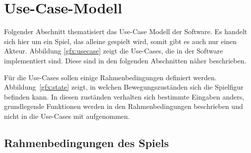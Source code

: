 \documentclass{article}
\begin{document}
\section{Use-Case-Modell} \label{subsec:usecase}

Folgender Abschnitt thematisiert das Use-Case Modell der Software. Es handelt sich hier um ein Spiel, das alleine gespielt wird, somit gibt es auch nur einen Akteur. Abbildung \ref{gfx:usecase} zeigt die Use-Cases, die in der Software implementiert sind. Diese sind in den folgenden Abschnitten näher beschrieben.

Für die Use-Cases sollen einige Rahmenbedingungen definiert werden. Abbildung~\ref{gfx:state} zeigt, in welchen Bewegungszuständen sich die Spielfigur befinden kann. In diesen zuständen verhalten sich bestimmte Eingaben anders, grundlegende Funktionen werden in den Rahmenbedingungen beschrieben und nicht in die Use-Cases mit aufgenommen.

\subsection*{Rahmenbedingungen des Spiels}
\end{document}
